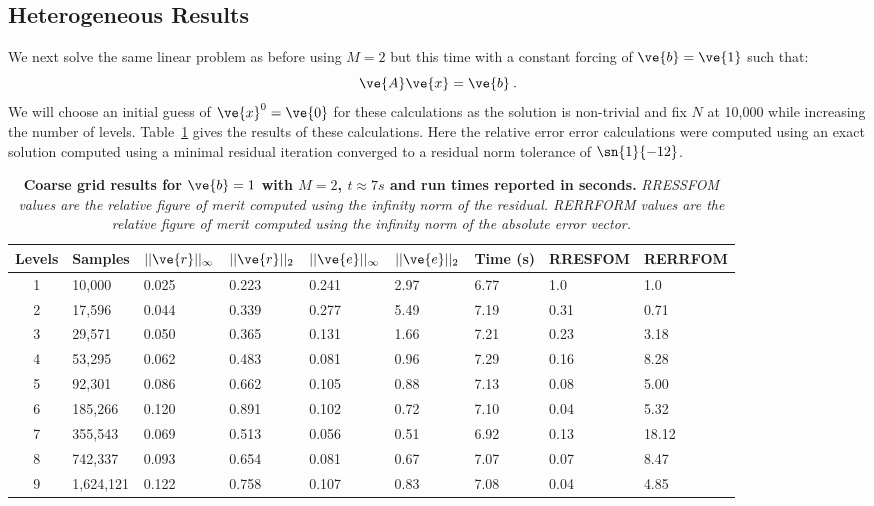 \documentclass[note]{TechNote}
\begin{document}
\subsection{Heterogeneous Results}
We next solve the same linear problem as before using $M=2$ but this
time with a constant forcing of $\ve{b}=\ve{1}$ such that:
\begin{equation}
  \ve{A}\ve{x} = \ve{b}\:.
  \label{eq:heterogeneous_problem}
\end{equation}
We will choose an initial guess of $\ve{x}^0 = \ve{0}$ for these
calculations as the solution is non-trivial and fix $N$ at 10,000
while increasing the number of
levels. Table~\ref{tab:heterogeneous_fixed_t} gives the results of
these calculations. Here the relative error error calculations were
computed using an exact solution computed using a minimal residual
iteration converged to a residual norm tolerance of $\sn{1}{-12}$.
\begin{table}[h!]
  \begin{center}
    \begin{tabular}{cllllllll}\hline\hline
      \multicolumn{1}{c}{\textbf{Levels}} &
      \multicolumn{1}{l}{\textbf{Samples}} &
      \multicolumn{1}{l}{\textbf{$||\ve{r}||_{\infty}$}} &
      \multicolumn{1}{l}{\textbf{$||\ve{r}||_{2}$}} &
      \multicolumn{1}{l}{\textbf{$||\ve{e}||_{\infty}$}} &
      \multicolumn{1}{l}{\textbf{$||\ve{e}||_{2}$}} &
      \multicolumn{1}{l}{\textbf{Time (s)}} &
      \multicolumn{1}{l}{\textbf{RRESFOM}} &
      \multicolumn{1}{l}{\textbf{RERRFOM}} \\
      \hline
      1 & 10,000 & 0.025 & 0.223 & 0.241 & 2.97 & 6.77 & 1.0 & 1.0 \\
      2 & 17,596 & 0.044 & 0.339 & 0.277 & 5.49 & 7.19 & 0.31 & 0.71 \\
      3 & 29,571 & 0.050 & 0.365 & 0.131 & 1.66 & 7.21 & 0.23 & 3.18 \\
      4 & 53,295 & 0.062 & 0.483 & 0.081 & 0.96 & 7.29 & 0.16 & 8.28 \\
      5 & 92,301 & 0.086 & 0.662 & 0.105 & 0.88 & 7.13 & 0.08 & 5.00 \\
      6 & 185,266 & 0.120 & 0.891 & 0.102 & 0.72 & 7.10 & 0.04 & 5.32 \\
      7 & 355,543 & 0.069 & 0.513 & 0.056 & 0.51 & 6.92 & 0.13 & 18.12 \\
      8 & 742,337 & 0.093 & 0.654 & 0.081 & 0.67 & 7.07 & 0.07 & 8.47 \\
      9 & 1,624,121 & 0.122 & 0.758 & 0.107 & 0.83 & 7.08 & 0.04 &
      4.85 \\
      \hline\hline
    \end{tabular}
  \end{center}
  \caption{\textbf{Coarse grid results for $\ve{b} = 1$ with $M = 2$,
      $t \approx 7s$ and run times reported in seconds.}
    \textit{RRESSFOM values are the relative figure of merit computed
      using the infinity norm of the residual. RERRFORM values are the
      relative figure of merit computed using the infinity norm of the
      absolute error vector.}}
  \label{tab:heterogeneous_fixed_t}
\end{table}
\end{document}

